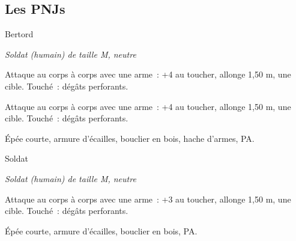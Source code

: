 \documentclass[a4paper,10pt,openany]{book}
\begin{document}
\begin{multicols}{2}
\pagebreak
\section{Les PNJs}

\begin{monsterbox}{Bertord}
	\begin{hangingpar}
		\textit{Soldat (humain) de taille M, neutre}
	\end{hangingpar}
	\dndline%
	\basics[%
	armorclass = {16 (armure d’écailles, bouclier)},
	hitpoints  = \dice{3d8 + 3},
	speed      = 9 m
	]
	\dndline%
	\stats[
	STR = \stat{15},
	CON = \stat{12} 
	]
	\dndline%
	\details[%
	skills= Intimidation +2,
	senses= Perception passive 10,
	languages = {bas-thrain, nothrain},
	challenge= 1/4
	]
	\dndline%
	\begin{monsteraction}
		Attaque au corps à corps avec une arme : +4 au toucher, allonge 1,50 m, une cible. Touché :  dégâts perforants.
	\end{monsteraction}
	\begin{monsteraction}
		Attaque au corps à corps avec une arme : +4 au toucher, allonge 1,50 m, une cible. Touché :  dégâts perforants.
	\end{monsteraction}
	\dndline%
	\begin{monsteraction}[Possessions]
		Épée courte, armure d’écailles, bouclier en bois, hache d’armes,  PA.
	\end{monsteraction}
\end{monsterbox}

\begin{monsterbox}{Soldat}
	\begin{hangingpar}
		\textit{Soldat (humain) de taille M, neutre}
	\end{hangingpar}
	\dndline%
	\basics[%
	armorclass = {16 (armure d’écailles, bouclier)},
	hitpoints  = \dice{2d8 + 2},
	speed      = 9 m
	]
	\dndline%
	\stats[
	STR = \stat{12},
	CON = \stat{12} 
	]
	\dndline%
	\details[%
	senses= Perception passive 10,
	languages = bas-thrain,
	challenge= 1/8
	]
	\dndline%
	\begin{monsteraction}
		Attaque au corps à corps avec une arme : +3 au toucher, allonge 1,50 m, une cible. Touché :  dégâts perforants.
	\end{monsteraction}
	\dndline%
	\begin{monsteraction}[Possessions]
		Épée courte, armure d’écailles, bouclier en bois,  PA.
	\end{monsteraction}
\end{monsterbox}


\end{multicols}
\end{document}
